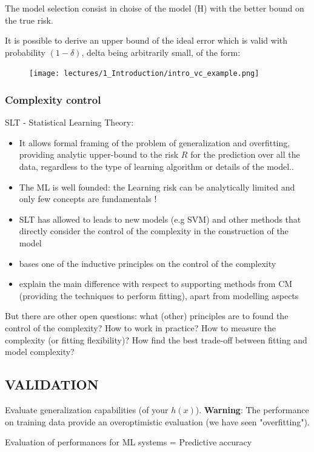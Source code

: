 \documentclass[../main.tex]{subfiles}
\begin{document}
\begin{definition}
The model selection consist in choise of the model (H) with the better bound on the true risk.
\end{definition}
\begin{example}
It is possible to derive an upper bound of the ideal error which is valid with probability $(1-\delta)$, delta being arbitrarily small, of the form:
\end{example}

\begin{figure}[ht]
    \centering
    \texttt{[image: lectures/1\_Introduction/intro\_vc\_example.png]}
\end{figure}

\subsubsection{Complexity control}
SLT - Statistical Learning Theory:
\begin{itemize}
    \item It allows formal framing of the problem of generalization and overfitting, providing analytic upper-bound to the risk $R$ for the prediction over all the data, regardless to the type of learning algorithm or details of the model..
    
    \item The ML is well founded: the Learning risk can be analytically limited and only few concepts are fundamentals !
    
    \item SLT has allowed to leads to new models (e.g SVM) and other methods that directly consider the control of the complexity in the construction of the model
    
    \item bases one of the inductive principles on the control of the complexity
    
    \item explain the main difference with respect to supporting methods from CM (providing
the techniques to perform fitting), apart from modelling aspects
\end{itemize}

But there are other open questions: what (other) principles are to found the control of the complexity? How to work in practice? How to measure the complexity (or fitting flexibility)? How find the best trade-off between fitting and model complexity?

\subsection{VALIDATION}
Evaluate generalization capabilities (of your $h(x)$). \textbf{Warning}: The performance on training data provide an overoptimistic evaluation (we have seen "overfitting").
\begin{center}
    Evaluation of performances for ML systems = Predictive accuracy
\end{center}
\end{document}
